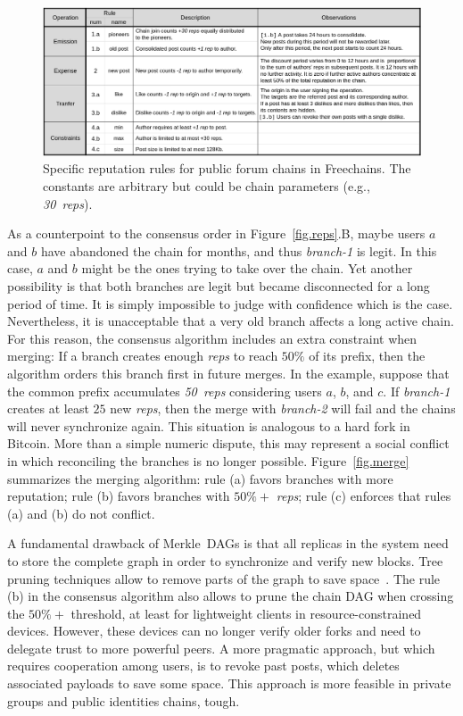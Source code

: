 \documentclass[10pt,journal,compsoc]{IEEEtran}
\newcommand{\FC}       {Freechains\xspace}
\newcommand{\reps}     {\emph{reps}\xspace}
\newcommand{\nreps}[1] {\emph{#1~reps\xspace}}
\begin{document}
\begin{figure}
\centering
\includegraphics[width=\textwidth]{rules.png}
\caption{
    Specific reputation rules for public forum chains in \FC.
    The constants are arbitrary but could be chain parameters
    (e.g., \nreps{30}).
}
\label{fig.rules}
\end{figure}

As a counterpoint to the consensus order in Figure~\ref{fig.reps}.B, maybe
users $a$ and $b$ have abandoned the chain for months, and thus \emph{branch-1}
is legit.
In this case, $a$ and $b$ might be the ones trying to take over the chain.
Yet another possibility is that both branches are legit but became disconnected
for a long period of time.
It is simply impossible to judge with confidence which is the case.
Nevertheless, it is unacceptable that a very old branch affects a long active
chain.
For this reason, the consensus algorithm includes an extra constraint when
merging:
If a branch creates enough \reps to reach $50\%$ of its prefix, then the
algorithm orders this branch first in future merges.
In the example, suppose that the common prefix accumulates \nreps{50}
considering users $a$, $b$, and $c$.
If \emph{branch-1} creates at least $25$ new \reps, then the merge with
\emph{branch-2} will fail and the chains will never synchronize again.
This situation is analogous to a hard fork in Bitcoin.
More than a simple numeric dispute, this may represent a social conflict in
which reconciling the branches is no longer possible.
%
Figure~\ref{fig.merge} summarizes the merging algorithm:
    rule (a) favors branches with more reputation;
    rule (b) favors branches with $50\%+$ \reps;
    rule (c) enforces that rules (a) and (b) do not conflict.

A fundamental drawback of Merkle~DAGs is that all replicas in the system need
to store the complete graph in order to synchronize and verify new blocks.
Tree pruning techniques allow to remove parts of the graph to save
space~\cite{p2p.prune}.
The rule (b) in the consensus algorithm also allows to prune the chain DAG when
crossing the $50\%+$ threshold, at least for lightweight clients in
resource-constrained devices.
However, these devices can no longer verify older forks and need to delegate
trust to more powerful peers.
%
A more pragmatic approach, but which requires cooperation among users, is to
revoke past posts, which deletes associated payloads to save some space.
This approach is more feasible in private groups and public identities chains,
tough.
\end{document}
